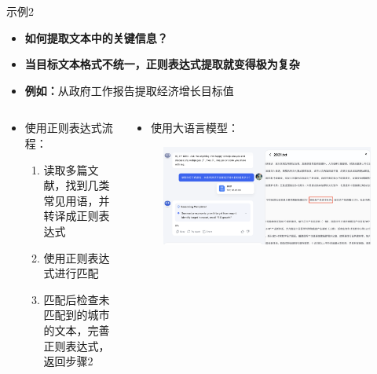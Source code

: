 \documentclass{beamer}
\begin{document}
\begin{frame}{示例2}
	\begin{itemize}
	\item \textbf{如何提取文本中的关键信息？}
	\item \textbf{当目标文本格式不统一，正则表达式提取就变得极为复杂} 
	\item \textbf{例如：}从政府工作报告提取经济增长目标值
\end{itemize}
    \begin{columns}
	\begin{column}{.5\textwidth}
		\begin{itemize}
		\item 使用正则表达式流程：
		\begin{enumerate}
			\item 读取多篇文献，找到几类常见用语，并转译成正则表达式
			\item 使用正则表达式进行匹配
			\item 匹配后检查未匹配到的城市的文本，完善正则表达式，返回步骤2
		\end{enumerate} 
	\end{itemize}
	\end{column}
	\begin{column}{.45\textwidth}
			\begin{itemize}
			\item 使用大语言模型：
		\end{itemize}
	\begin{figure}[htpb]
	\centering
	\includegraphics[width=1.34\linewidth]{figs/经济增长.png}
\end{figure}
	\end{column}
\end{columns}
\end{frame}
\end{document}
